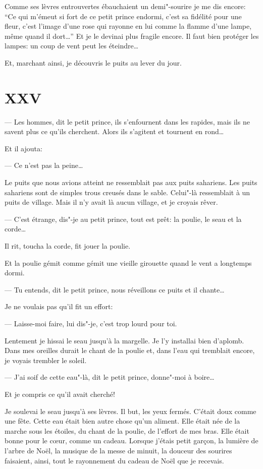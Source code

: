 Comme ses lèvres entrouvertes ébauchaient un demi"-sourire je me dis encore: ``Ce qui
m'émeut si fort de ce petit prince endormi, c'est sa fidélité pour une fleur, c'est
l'image d’une rose qui rayonne en lui comme la flamme d'une lampe, même quand il
dort\ldots{}'' Et je le devinai plus fragile encore. Il faut bien protéger les lampes:
un coup de vent peut les éteindre\ldots{}

Et, marchant ainsi, je découvris le puits au lever du jour.

\section{XXV}
--- Les hommes, dit le petit prince, ils s'enfournent dans les rapides, mais ils ne
savent plus ce qu'ils cherchent. Alors ils s'agitent et tournent en rond\ldots{}

Et il ajouta:

--- Ce n'est pas la peine\ldots{}

Le puits que nous avions atteint ne ressemblait pas aux puits sahariens. Les puits
sahariens sont de simples trous creusés dans le sable. Celui"-là ressemblait à un
puits de village. Mais il n'y avait là aucun village, et je croyais rêver.

--- C'est étrange, dis"-je au petit prince, tout est prêt: la poulie, le seau et
la corde\ldots{}

Il rit, toucha la corde, fit jouer la poulie.

Et la poulie gémit comme gémit une vieille girouette quand le vent a longtemps dormi.

--- Tu entends, dit le petit prince, nous réveillons ce puits et il chante\ldots{}

Je ne voulais pas qu'il fit un effort:

--- Laisse-moi faire, lui dis"-je, c'est trop lourd pour toi.

Lentement je hissai le seau jusqu'à la margelle. Je l'y installai bien d'aplomb.
Dans mes oreilles durait le chant de la poulie et, dans l'eau qui tremblait encore,
je voyais trembler le soleil.

--- J'ai soif de cette eau"-là, dit le petit prince, donne"-moi à boire\ldots{}

Et je compris ce qu'il avait cherché!

Je soulevai le seau jusqu'à ses lèvres. Il but, les yeux fermés. C'était doux comme
une fête. Cette eau était bien autre chose qu'un aliment. Elle était née de la marche
sous les étoiles, du chant de la poulie, de l'effort de mes bras. Elle était bonne
pour le cœur, comme un cadeau. Lorsque j'étais petit garçon, la lumière de l'arbre
de Noël, la musique de la messe de minuit, la douceur des sourires faisaient, ainsi,
tout le rayonnement du cadeau de Noël que je recevais.

